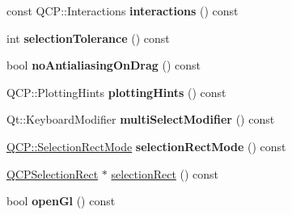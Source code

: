 \begin{DoxyCompactItemize}
\item 
const Q\+C\+P\+::\+Interactions {\bfseries interactions} () const \hypertarget{class_q_custom_plot_a12401c02b6949a717f5749bb28c62983}{}\label{class_q_custom_plot_a12401c02b6949a717f5749bb28c62983}

\item 
int {\bfseries selection\+Tolerance} () const \hypertarget{class_q_custom_plot_a7b738074c75e80070ef6a10263c6cd69}{}\label{class_q_custom_plot_a7b738074c75e80070ef6a10263c6cd69}

\item 
bool {\bfseries no\+Antialiasing\+On\+Drag} () const \hypertarget{class_q_custom_plot_ae07f2895a34d13a97a10cae4d8e17a36}{}\label{class_q_custom_plot_ae07f2895a34d13a97a10cae4d8e17a36}

\item 
Q\+C\+P\+::\+Plotting\+Hints {\bfseries plotting\+Hints} () const \hypertarget{class_q_custom_plot_a130b55e205697a5288081e9fc11e443e}{}\label{class_q_custom_plot_a130b55e205697a5288081e9fc11e443e}

\item 
Qt\+::\+Keyboard\+Modifier {\bfseries multi\+Select\+Modifier} () const \hypertarget{class_q_custom_plot_a9b6b1a0fea8da3fda6d5e3d687202877}{}\label{class_q_custom_plot_a9b6b1a0fea8da3fda6d5e3d687202877}

\item 
\hyperlink{namespace_q_c_p_ac9aa4d6d81ac76b094f9af9ad2d3aacf}{Q\+C\+P\+::\+Selection\+Rect\+Mode} {\bfseries selection\+Rect\+Mode} () const \hypertarget{class_q_custom_plot_afae2023152cd30e7052b536148226a04}{}\label{class_q_custom_plot_afae2023152cd30e7052b536148226a04}

\item 
\hyperlink{class_q_c_p_selection_rect}{Q\+C\+P\+Selection\+Rect} $\ast$ \hyperlink{class_q_custom_plot_ae64a3994735d8f592a60d9430526a163}{selection\+Rect} () const 
\item 
bool {\bfseries open\+Gl} () const \hypertarget{class_q_custom_plot_ab81fd5b380574c6dee92b6d8c8fd1b18}{}\label{class_q_custom_plot_ab81fd5b380574c6dee92b6d8c8fd1b18}


\end{DoxyCompactItemize}
